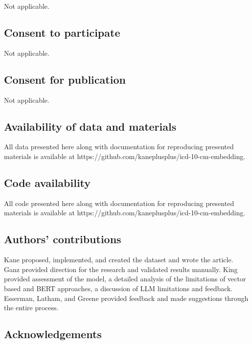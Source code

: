 \documentclass{bmcart}
\begin{document}
\begin{backmatter}
Not applicable.

\subsection*{Consent to participate}

Not applicable.

\subsection*{Consent for publication}

Not applicable.


\subsection*{Availability of data and materials}%

All data presented here along with documentation for 
reproducing presented materials is available at 
https://github.com/kaneplusplus/icd-10-cm-embedding.

\subsection*{Code availability}%

All code presented here along with documentation for 
reproducing presented materials is available at 
https://github.com/kaneplusplus/icd-10-cm-embedding.

\subsection*{Authors' contributions}

Kane proposed, implemented, and created the dataset and wrote the article. 
Ganz provided direction for the research and validated results manually. 
King provided assessment of the model, a detailed analysis of the limitations 
of vector based and BERT approaches, a discussion of LLM 
limitations and feedback.
Esserman, Latham, and Greene provided feedback and made suggestions through the 
entire process. 

\subsection{Acknowledgements}


\end{backmatter}
\end{document}
